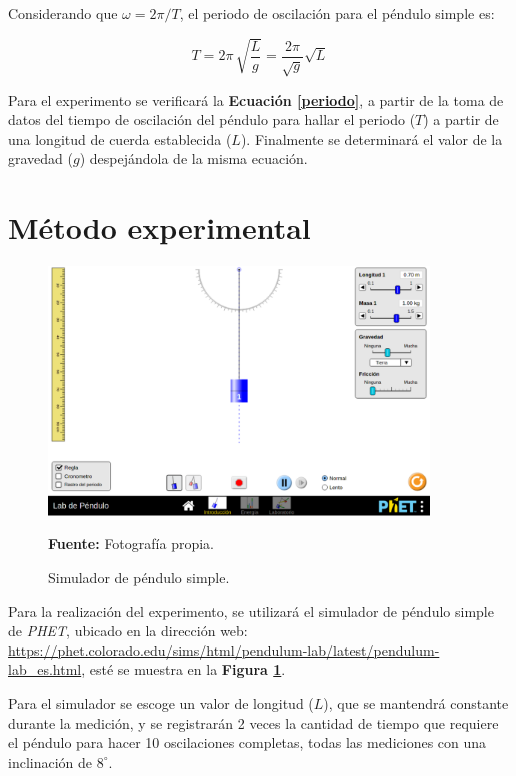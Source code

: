 \documentclass[letter,11pt]{article}
\newcommand{\source}[1]{\vspace{-11pt} \caption*{\small{\textbf{Fuente:} {#1}}}}
\begin{document}
Considerando que $\omega = 2\pi / T$, el periodo de oscilación para el péndulo
simple es:

\begin{equation}
    T = 2\pi\, \sqrt{\frac{L}{g}} = \frac{2\pi}{\sqrt{g}} \sqrt{L}
\label{periodo}
\end{equation}
\vspace{-0.16cm}

Para el experimento se verificará la \textbf{Ecuación \ref{periodo}}, a partir
de la toma de datos del tiempo de oscilación del péndulo para hallar el periodo
($T$) a partir de una longitud de cuerda establecida ($L$). Finalmente se
determinará el valor de la gravedad ($g$) despejándola de la misma ecuación.

\section{Método experimental}

\begin{figure}
\centering
\includegraphics[width=0.90\textwidth]{resources/f2.eps}
\caption{Simulador de péndulo simple.}
\label{figura2}
\source{Fotografía propia.}
\end{figure}

Para la realización del experimento, se utilizará el simulador de péndulo simple
de \emph{PHET}, ubicado en la dirección web:
\url{https://phet.colorado.edu/sims/html/pendulum-lab/latest/pendulum-lab_es.html},
esté se muestra en la \textbf{Figura \ref{figura2}}.

Para el simulador se escoge un valor de longitud ($L$), que se mantendrá
constante durante la medición, y se registrarán 2 veces la cantidad de tiempo
que requiere el péndulo para hacer 10 oscilaciones completas, todas las
mediciones con una inclinación de $8^\circ$.
\end{document}
